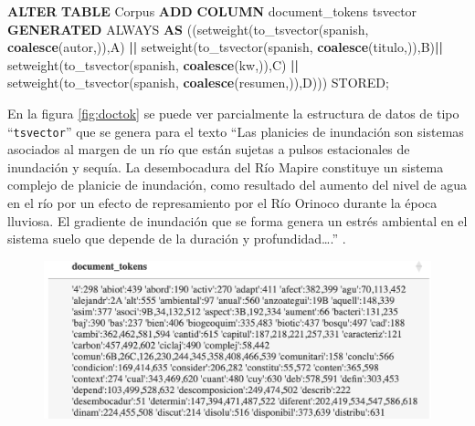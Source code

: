 \documentclass[
  12pt,
  openany]{book}
\newenvironment{Shaded}{\begin{snugshade}}{\end{snugshade}}
\newcommand{\FunctionTok}[1]{\textcolor[rgb]{0.13,0.29,0.53}{\textbf{#1}}}
\newcommand{\KeywordTok}[1]{\textcolor[rgb]{0.13,0.29,0.53}{\textbf{#1}}}
\newcommand{\NormalTok}[1]{#1}
\newcommand{\OperatorTok}[1]{\textcolor[rgb]{0.81,0.36,0.00}{\textbf{#1}}}
\newcommand{\StringTok}[1]{\textcolor[rgb]{0.31,0.60,0.02}{#1}}
\begin{document}
\begin{enumerate}
\begin{Shaded}
\begin{Highlighting}[]
\KeywordTok{ALTER} \KeywordTok{TABLE}\NormalTok{ Corpus }\KeywordTok{ADD} \KeywordTok{COLUMN}\NormalTok{ document\_tokens tsvector}
\KeywordTok{GENERATED}\NormalTok{ ALWAYS }\KeywordTok{AS}\NormalTok{ ((setweight(to\_tsvector(}\StringTok{\textquotesingle{}spanish\textquotesingle{}}\NormalTok{,}
                        \FunctionTok{coalesce}\NormalTok{(autor,}\StringTok{\textquotesingle{}\textquotesingle{}}\NormalTok{)),}\StringTok{\textquotesingle{}A\textquotesingle{}}\NormalTok{) }\OperatorTok{||}  
\NormalTok{                      setweight(to\_tsvector(}\StringTok{\textquotesingle{}spanish\textquotesingle{}}\NormalTok{,}
                        \FunctionTok{coalesce}\NormalTok{(titulo,}\StringTok{\textquotesingle{}\textquotesingle{}}\NormalTok{)),}\StringTok{\textquotesingle{}B\textquotesingle{}}\NormalTok{)}\OperatorTok{||}  
\NormalTok{                      setweight(to\_tsvector(}\StringTok{\textquotesingle{}spanish\textquotesingle{}}\NormalTok{,}
                        \FunctionTok{coalesce}\NormalTok{(kw,}\StringTok{\textquotesingle{}\textquotesingle{}}\NormalTok{)),}\StringTok{\textquotesingle{}C\textquotesingle{}}\NormalTok{)    }\OperatorTok{||}  
\NormalTok{                        setweight(to\_tsvector(}\StringTok{\textquotesingle{}spanish\textquotesingle{}}\NormalTok{,}
                        \FunctionTok{coalesce}\NormalTok{(resumen,}\StringTok{\textquotesingle{}\textquotesingle{}}\NormalTok{)),}\StringTok{\textquotesingle{}D\textquotesingle{}}\NormalTok{))) STORED;}
\end{Highlighting}
\end{Shaded}

  En la figura \ref{fig:doctok} se puede ver parcialmente la estructura de datos de tipo ``\texttt{tsvector}'' que se genera para el texto ``Las planicies de inundación son sistemas asociados al margen de un río que están sujetas a pulsos estacionales de inundación y sequía. La desembocadura del Río Mapire constituye un sistema complejo de planicie de inundación, como resultado del aumento del nivel de agua en el río por un efecto de represamiento por el Río Orinoco durante la época lluviosa. El gradiente de inundación que se forma genera un estrés ambiental en el sistema suelo que depende de la duración y profundidad\ldots.'' .

  \begin{figure}

  {\centering \includegraphics[width=0.7\linewidth]{images/05-desarrollo/2_ciclo/esquemas/doc_tokens} 

}
\end{figure}
\end{enumerate}
\end{document}
